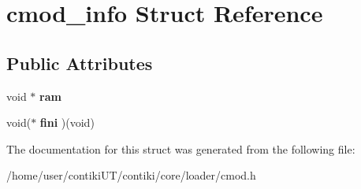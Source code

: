 \hypertarget{structcmod__info}{}\section{cmod\+\_\+info Struct Reference}
\label{structcmod__info}
\subsection*{Public Attributes}
\begin{DoxyCompactItemize}
\item 
\hypertarget{structcmod__info_aea737ad64a2e214c5b8dc06c13ce9856}{}void $\ast$ {\bfseries ram}\label{structcmod__info_aea737ad64a2e214c5b8dc06c13ce9856}

\item 
\hypertarget{structcmod__info_ace4696863767fee9d06e7e215726efb1}{}void($\ast$ {\bfseries fini} )(void)\label{structcmod__info_ace4696863767fee9d06e7e215726efb1}

\end{DoxyCompactItemize}


The documentation for this struct was generated from the following file\+:\begin{DoxyCompactItemize}
\item 
/home/user/contiki\+U\+T/contiki/core/loader/cmod.\+h\end{DoxyCompactItemize}
